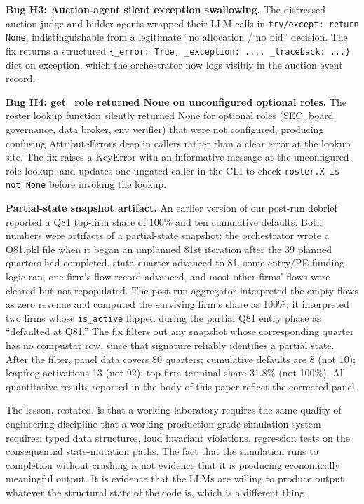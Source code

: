 \documentclass[11pt]{article}
\begin{document}
\textbf{Bug H3: Auction-agent silent exception swallowing.} The
distressed-auction judge and bidder agents wrapped their LLM calls in
\texttt{try/except: return None}, indistinguishable from a legitimate
``no allocation / no bid'' decision. The fix returns a structured
\texttt{\{\_error: True, \_exception: ..., \_traceback: ...\}} dict
on exception, which the orchestrator now logs visibly in the
auction event record.

\textbf{Bug H4: get\_role returned None on unconfigured optional roles.}
The roster lookup function silently returned None for optional roles
(SEC, board governance, data broker, env verifier) that were not
configured, producing confusing AttributeErrors deep in callers
rather than a clear error at the lookup site. The fix raises a
KeyError with an informative message at the unconfigured-role
lookup, and updates one ungated caller in the CLI to check
\texttt{roster.X is not None} before invoking the lookup.

\textbf{Partial-state snapshot artifact.} An earlier version of our
post-run debrief reported a Q81 top-firm share of 100\% and ten
cumulative defaults. Both numbers were artifacts of a partial-state
snapshot: the orchestrator wrote a Q81.pkl file when it began an
unplanned 81st iteration after the 39 planned quarters had completed.
state.\,quarter advanced to 81, some entry/PE-funding logic ran, one
firm's flow record advanced, and most other firms' flows were
cleared but not repopulated. The post-run aggregator interpreted the
empty flows as zero revenue and computed the surviving firm's share
as 100\%; it interpreted two firms whose \texttt{is\_active} flipped
during the partial Q81 entry phase as ``defaulted at Q81.'' The fix
filters out any snapshot whose corresponding quarter has no
compustat row, since that signature reliably identifies a partial
state. After the filter, panel data covers 80 quarters; cumulative
defaults are 8 (not 10); leapfrog activations 13 (not 92); top-firm
terminal share 31.8\% (not 100\%). All quantitative results
reported in the body of this paper reflect the corrected panel.

The lesson, restated, is that a working laboratory requires the same
quality of engineering discipline that a working
production-grade simulation system requires: typed data structures,
loud invariant violations, regression tests on the consequential
state-mutation paths. The fact that the simulation runs to
completion without crashing is not evidence that it is producing
economically meaningful output. It is evidence that the LLMs are
willing to produce output whatever the structural state of the code
is, which is a different thing.
\end{document}
